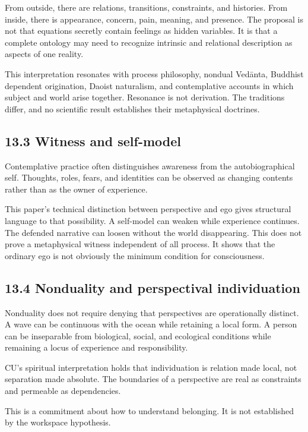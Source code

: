 \documentclass[
  11pt,
]{article}
\begin{document}
From outside, there are relations, transitions, constraints, and
histories. From inside, there is appearance, concern, pain, meaning, and
presence. The proposal is not that equations secretly contain feelings
as hidden variables. It is that a complete ontology may need to
recognize intrinsic and relational description as aspects of one
reality.

This interpretation resonates with process philosophy, nondual Vedānta,
Buddhist dependent origination, Daoist naturalism, and contemplative
accounts in which subject and world arise together. Resonance is not
derivation. The traditions differ, and no scientific result establishes
their metaphysical doctrines.

\subsection{13.3 Witness and self-model}\label{witness-and-self-model}

Contemplative practice often distinguishes awareness from the
autobiographical self. Thoughts, roles, fears, and identities can be
observed as changing contents rather than as the owner of experience.

This paper's technical distinction between perspective and ego gives
structural language to that possibility. A self-model can weaken while
experience continues. The defended narrative can loosen without the
world disappearing. This does not prove a metaphysical witness
independent of all process. It shows that the ordinary ego is not
obviously the minimum condition for consciousness.

\subsection{13.4 Nonduality and perspectival
individuation}\label{nonduality-and-perspectival-individuation}

Nonduality does not require denying that perspectives are operationally
distinct. A wave can be continuous with the ocean while retaining a
local form. A person can be inseparable from biological, social, and
ecological conditions while remaining a locus of experience and
responsibility.

CU's spiritual interpretation holds that individuation is relation made
local, not separation made absolute. The boundaries of a perspective are
real as constraints and permeable as dependencies.

This is a commitment about how to understand belonging. It is not
established by the workspace hypothesis.
\end{document}
